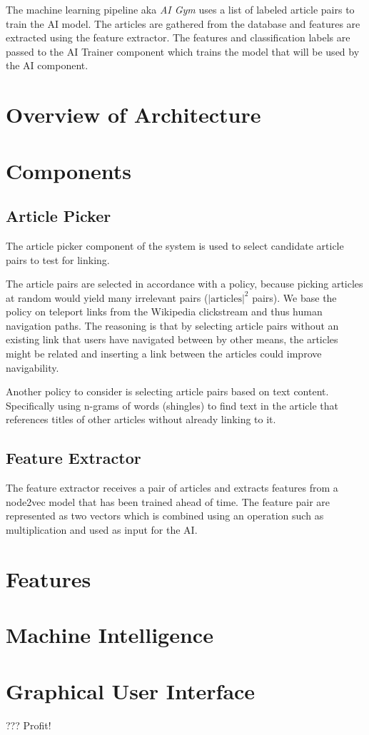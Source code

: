 The machine learning pipeline aka \textit{AI Gym\texttrademark} uses a list of labeled article pairs to train the AI model. The articles are gathered from the database and features are extracted using the feature extractor. The features and classification labels are passed to the AI Trainer component which trains the model that will be used by the AI component.


\section{Overview of Architecture}\label{sec:architecture}

\section{Components}

\subsection{Article Picker}
The article picker component of the system is used to select candidate article pairs to test for linking.

The article pairs are selected in accordance with a policy, because picking articles at random would yield many irrelevant pairs ($\left\vert{\text{articles}}\right\vert ^{2}$ pairs). We base the policy on teleport links from the Wikipedia clickstream and thus human navigation paths. The reasoning is that by selecting article pairs without an existing link that users have navigated between by other means, the articles might be related and inserting a link between the articles could improve navigability.

Another policy to consider is selecting article pairs based on text content. Specifically using n-grams of words (shingles) to find text in the article that references titles of other articles without already linking to it. 


\subsection{Feature Extractor}
The feature extractor receives a pair of articles and extracts features from a node2vec model that has been trained ahead of time. The feature pair are represented as two vectors which is combined using an operation such as multiplication  and used as input for the AI.

\section{Features}

\section{Machine Intelligence}

\section{Graphical User Interface}
??? Profit!